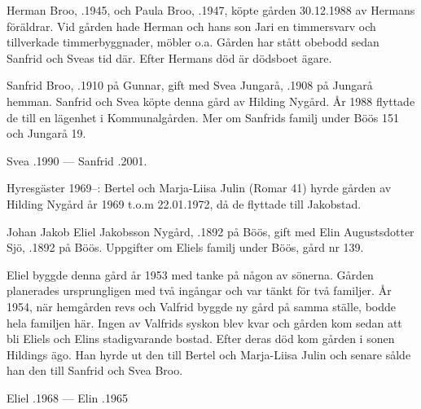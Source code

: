 %



%
Herman Broo, .1945, och Paula Broo, .1947, köpte gården 30.12.1988 av Hermans föräldrar. Vid gården hade Herman och hans son Jari en timmersvarv och tillverkade timmerbyggnader, möbler o.a. Gården har stått obebodd sedan Sanfrid och Sveas tid där. Efter Hermans död är dödsboet ägare.


%
Sanfrid Broo, .1910 på Gunnar, gift med Svea Jungarå, .1908 på Jungarå hemman. Sanfrid och Svea köpte denna gård av Hilding Nygård. År 1988 flyttade de till en lägenhet i Kommunalgården. Mer om Sanfrids familj under Böös 151 och Jungarå 19.

Svea .1990  ---  Sanfrid .2001.

Hyresgäster 1969--: Bertel och Marja-Liisa Julin (Romar 41) hyrde gården av  Hilding Nygård år 1969 t.o.m 22.01.1972, då de flyttade till Jakobstad.


%
Johan Jakob Eliel Jakobsson Nygård, .1892 på Böös, gift med Elin Augustsdotter Sjö, .1892 på Böös. Uppgifter om Eliels familj under Böös, gård nr 139.

Eliel byggde denna gård år 1953 med tanke på någon av sönerna. Gården planerades ursprungligen med två ingångar och var tänkt för två familjer. År 1954, när hemgården revs och Valfrid byggde ny gård på samma ställe, bodde hela familjen här. Ingen av Valfrids syskon blev kvar och gården kom sedan att bli Eliels och Elins stadigvarande bostad. Efter deras död kom gården i sonen Hildings ägo. Han hyrde ut den till Bertel och Marja-Liisa Julin och senare sålde han den till Sanfrid och Svea Broo.

Eliel .1968  ---  Elin .1965



%



